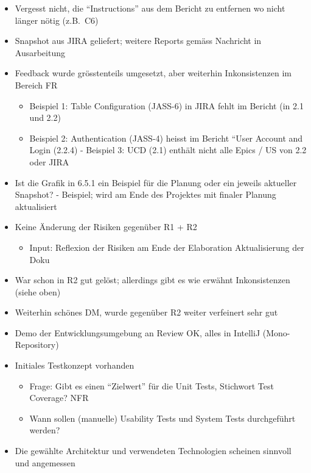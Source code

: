 \begin{itemize}
    \item Vergesst nicht, die ``Instructions'' aus dem Bericht zu entfernen wo nicht länger nötig (z.B.\ C6)
    \item Snapshot aus JIRA geliefert;
    weitere Reports gemäss Nachricht in Ausarbeitung
    \item Feedback wurde grösstenteils umgesetzt, aber weiterhin Inkonsistenzen im Bereich FR
    \begin{itemize}
        \item Beispiel 1: Table Configuration (JASS-6) in JIRA fehlt im Bericht (in 2.1 und 2.2)
        \item Beispiel 2: Authentication (JASS-4) heisst im Bericht ``User Account and Login (2.2.4) - Beispiel 3: UCD (2.1) enthält nicht alle Epics / US von 2.2 oder JIRA
    \end{itemize}
    \item Ist die Grafik in 6.5.1 ein Beispiel für die Planung oder ein jeweils aktueller Snapshot?
    - Beispiel;
    wird am Ende des Projektes mit finaler Planung aktualisiert
    \item Keine Änderung der Risiken gegenüber R1 + R2
    \begin{itemize}
        \item Input: Reflexion der Risiken am Ende der Elaboration \textrightarrow Aktualisierung der Doku
    \end{itemize}
    \item War schon in R2 gut gelöst;
    allerdings gibt es wie erwähnt Inkonsistenzen (siehe oben)
    \item Weiterhin schönes DM, wurde gegenüber R2 weiter verfeinert \textrightarrow sehr gut
    \item Demo der Entwicklungsumgebung an Review \textrightarrow OK, alles in IntelliJ (Mono-Repository)
    \item Initiales Testkonzept vorhanden
    \begin{itemize}
        \item Frage: Gibt es einen ``Zielwert'' für die Unit Tests, Stichwort Test Coverage? \textrightarrow NFR
        \item Wann sollen (manuelle) Usability Tests und System Tests durchgeführt werden?
    \end{itemize}
    \item Die gewählte Architektur und verwendeten Technologien scheinen sinnvoll und angemessen
    \begin{itemize}

\end{itemize}
\end{itemize}
